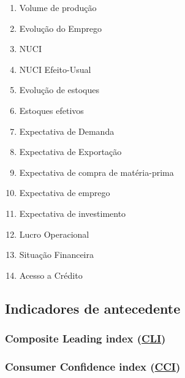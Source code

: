 \documentclass[11pt]{article}
\begin{document}
\begin{enumerate}
\item Volume de produção
\label{sec:orgd1099a1}

\item Evolução do Emprego
\label{sec:org3e0ade9}


\item NUCI
\label{sec:orge597003}

\item NUCI Efeito-Usual
\label{sec:org9072c99}

\item Evolução de estoques
\label{sec:orgda4d237}

\item Estoques efetivos
\label{sec:orga0aa2b7}

\item Expectativa de Demanda
\label{sec:org46c40e9}

\item Expectativa de Exportação
\label{sec:orgbed8a0a}

\item Expectativa de compra de matéria-prima
\label{sec:org55c37d7}

\item Expectativa de emprego
\label{sec:org011d595}

\item Expectativa de investimento
\label{sec:org6bc6b97}

\item Lucro Operacional
\label{sec:org8ae004f}

\item Situação Financeira
\label{sec:org5c948e7}


\item Acesso a Crédito
\label{sec:orge820b86}
\end{enumerate}

\subsection{Indicadores de antecedente}
\label{sec:org771e7aa}

\subsubsection{Composite Leading index (\href{https://stats.oecd.org/Index.aspx?DataSetCode=MEI\_CLI}{CLI})}
\label{sec:orgf5f72ee}


\subsubsection{Consumer Confidence index (\href{https://stats.oecd.org/Index.aspx?DataSetCode=MEI\_CCI}{CCI})}
\label{sec:org3fab739}
\end{document}
